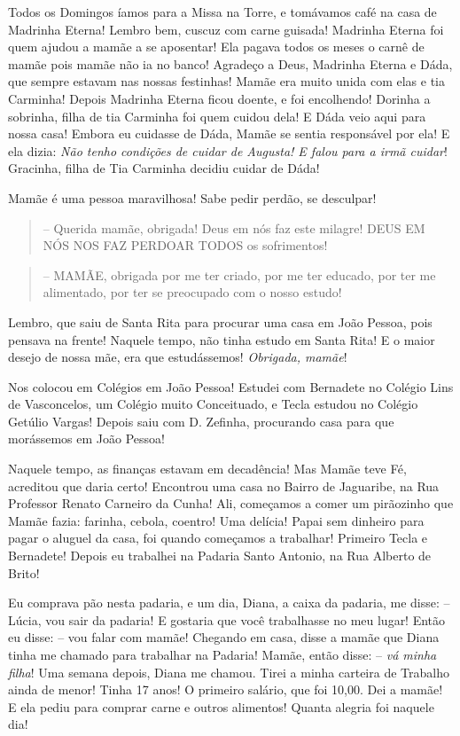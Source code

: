 \documentclass[
  brazil,
  a6paper,
  oneside,
  landscape,
  14pt]{scrbook}
\begin{document}
Todos os Domingos íamos para a Missa na Torre, e tomávamos café na casa
de Madrinha Eterna! Lembro bem, cuscuz com carne guisada! Madrinha
Eterna foi quem ajudou a mamãe a se aposentar! Ela pagava todos os meses
o carnê de mamãe pois mamãe não ia no banco! Agradeço a Deus, Madrinha
Eterna e Dáda, que sempre estavam nas nossas festinhas! Mamãe era muito
unida com elas e tia Carminha! Depois Madrinha Eterna ficou doente, e
foi encolhendo! Dorinha a sobrinha, filha de tia Carminha foi quem
cuidou dela! E Dáda veio aqui para nossa casa! Embora eu cuidasse de
Dáda, Mamãe se sentia responsável por ela! E ela dizia: \emph{Não tenho
condições de cuidar de Augusta! E falou para a irmã cuidar}! Gracinha,
filha de Tia Carminha decidiu cuidar de Dáda!

Mamãe é uma pessoa maravilhosa! Sabe pedir perdão, se desculpar!

\begin{quote}
-- Querida mamãe, obrigada! Deus em nós faz este milagre! DEUS EM NÓS
NOS FAZ PERDOAR TODOS os sofrimentos!
\end{quote}

\begin{quote}
-- MAMÃE, obrigada por me ter criado, por me ter educado, por ter me
alimentado, por ter se preocupado com o nosso estudo!
\end{quote}

Lembro, que saiu de Santa Rita para procurar uma casa em João Pessoa,
pois pensava na frente! Naquele tempo, não tinha estudo em Santa Rita! E
o maior desejo de nossa mãe, era que estudássemos! \emph{Obrigada,
mamãe}!

Nos colocou em Colégios em João Pessoa! Estudei com Bernadete no Colégio
Lins de Vasconcelos, um Colégio muito Conceituado, e Tecla estudou no
Colégio Getúlio Vargas! Depois saiu com D. Zefinha, procurando casa para
que morássemos em João Pessoa!

Naquele tempo, as finanças estavam em decadência! Mas Mamãe teve Fé,
acreditou que daria certo! Encontrou uma casa no Bairro de Jaguaribe, na
Rua Professor Renato Carneiro da Cunha! Ali, começamos a comer um
pirãozinho que Mamãe fazia: farinha, cebola, coentro! Uma delícia! Papai
sem dinheiro para pagar o aluguel da casa, foi quando começamos a
trabalhar! Primeiro Tecla e Bernadete! Depois eu trabalhei na Padaria
Santo Antonio, na Rua Alberto de Brito!

Eu comprava pão nesta padaria, e um dia, Diana, a caixa da padaria, me
disse: -- Lúcia, vou sair da padaria! E gostaria que você trabalhasse no
meu lugar! Então eu disse: -- vou falar com mamãe! Chegando em casa,
disse a mamãe que Diana tinha me chamado para trabalhar na Padaria!
Mamãe, então disse: -- \emph{vá minha filha}! Uma semana depois, Diana
me chamou. Tirei a minha carteira de Trabalho ainda de menor! Tinha 17
anos! O primeiro salário, que foi 10,00. Dei a mamãe! E ela pediu para
comprar carne e outros alimentos! Quanta alegria foi naquele dia!
\end{document}
